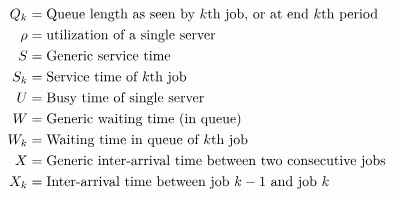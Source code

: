 \documentclass[queueing-book.tex]{subfiles}
\begin{document}
\begin{align*}
 Q_k &= \text{Queue length as seen by  $k$th job, or at  end  $k$th period} \\
 \rho &= \text{utilization of a single server} \\
 S &= \text{Generic service time} \\
 S_k &= \text{Service time of  $k$th job} \\
 U &= \text{Busy time of single server} \\
 W &= \text{Generic waiting time (in  queue)} \\
 W_{k} &= \text{Waiting time in  queue of~$k$th job} \\
 X &= \text{Generic inter-arrival time between two consecutive jobs} \\
 X_k &= \text{Inter-arrival time between job $k-1$ and job~$k$} \\
\end{align*}



\end{document}
